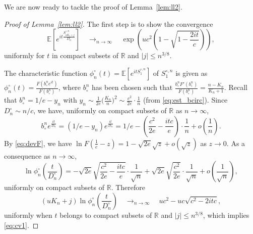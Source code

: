 \documentclass[AHL,XML,longabstracts,Unicode]{cedram}
\newcommand{\R}{\mathbb{R}}
\def\bcn{b_{\circ}^{n}}
\def\Scn{S^{\circ,n}}
\def\phicn{\phi^{\circ}_{n}}
\def\Dcn{D^{\circ}_{n}}
\newcommand\Es[1]{\mathbb{E}\left[#1\right]}
\begin{document}
We are now ready to tackle the proof of Lemma~\ref{lem:ll2}.
\begin{proof}[Proof of Lemma~\ref{lem:ll2}]
The first step is to show the convergence
\begin{equation}
\label{eq:cv1}\Es{e^{i t \frac{\Scn_{ u K_{n} +j}}{ \Dcn }}}  \quad \mathop{\longrightarrow}_{n \rightarrow \infty} \quad \exp \left( u c^{2} \left( 1 -\sqrt{1-  \frac{2it}{c}}  \right)  \right),
\end{equation}
uniformly for $t$ in compact subsets of $\R$ and $|j| \leq n^{3/8}$.

The characteristic function $\phicn(t)=\Es{e^{it\Scn_{1}}}$  of $\Scn_{1}$
is given as $\phicn(t)= \frac{F( \bcn e^{it})}{F(\bcn)}$,
where $\bcn$ has been chosen such that $ \frac{\bcn F'(\bcn)}{F(\bcn)}= \frac{n-K_{n}}{K_{n}+1}$.
Recall that $\bcn=1/e-y_{n}$ with
\hbox{$y_{n} \sim \frac{1}{2e}  \big( \frac{K_{n}}{n} \big)^{2} \sim \frac{c^{2}}{2e} \cdot \frac{1}{n}$}
(from \eqref{eq:est_bcirc}).
Since $ \Dcn \sim  n /c$, we have, uniformly on compact subsets of $\R$ as $n \rightarrow \infty$,
\[\bcn e^{ \frac{it}{\Dcn}}=(1/e-y_{n})e^{ \frac{it}{\Dcn}}=1/e-  \left( \frac{c^{2}}{2e} - \frac{it c}{e } \right) \cdot \frac{1}{{n}}+o \left(  \frac{1}{n} \right).\]
By \eqref{eq:devF}, we have $ \ln F \left( \frac{1}{e}-z \right)= 1-\sqrt{2e} \sqrt{z}+o(\sqrt{z})$ as $z \rightarrow 0$.
As a consequence as $n \rightarrow \infty$, \[\ln \phicn \left( \frac{t}{ \Dcn } \right)=-\sqrt{2e} \sqrt{ \frac{c^{2}}{2e} - \frac{it c}{e}} \cdot \frac{1}{\sqrt{n}} + \sqrt{2e} \sqrt{ \frac{c^{2}}{2e}} \cdot \frac{1}{\sqrt{n}}+o \left(  \frac{1}{\sqrt{n}} \right),\]
 uniformly on compact subsets of $\R$. Therefore
\[( uK_{n}  +j) \ln \phicn \left( \frac{t}{\Dcn} \right)  \quad \mathop{\longrightarrow}_{n \rightarrow \infty} \quad u c^{2}-uc \sqrt{c^{2}- 2itc},\]
 uniformly when $t$ belongs to compact subsets of $\R$ and $|j| \leq n^{3/8}$, which implies \eqref{eq:cv1}.


\end{proof}
\end{document}
